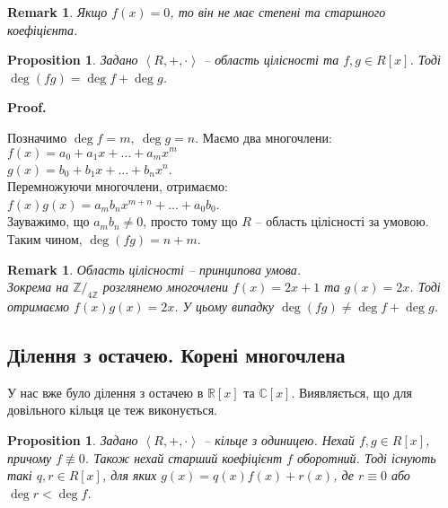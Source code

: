 \documentclass[a4paper, 10pt]{article}
\makeatletter
\theoremstyle{theoremdd}
\theoremstyle{theoremdd}
\theoremstyle{theoremdd}
\theoremstyle{theoremdd}
\theoremstyle{theoremdd}
\theoremstyle{theoremdd}
\theoremstyle{theoremdd}
\theoremstyle{theoremdd}
\theoremstyle{theoremdd}
\newtheorem{proposition}[theorem]{Proposition}
\theoremstyle{theoremdd}
\theoremstyle{theoremdd}
\newtheorem{remark}[theorem]{Remark}
\theoremstyle{theoremdd}
\theoremstyle{theoremdd}
\theoremstyle{theoremdd}
\theoremstyle{theoremdd}
\renewenvironment{proof}[1][Proof.\\]{\par
\pushQED{\hfill \qed}%
\normalfont \topsep6\p@\@plus6\p@\relax
\trivlist
\item\relax
{\bfseries
#1\@addpunct{.}}\hspace\labelsep\ignorespaces
}{%
\popQED\endtrivlist\@endpefalse
}
\makeatother
\begin{document}
\begin{remark}
Якщо $f(x) = 0$, то він не має степені та старшного коефіцієнта.
\end{remark}

\begin{proposition}
Задано $\left<R,+,\cdot\right>$ -- область цілісності та $f,g \in R[x]$. Тоді $\deg (fg) = \deg f + \deg g$.
\end{proposition}

\begin{proof}
Позначимо $\deg f = m,\ \deg g = n$. Маємо два многочлени:\\
$f(x) = a_0 + a_1 x + \dots + a_m x^m$\\
$g(x) = b_0 + b_1 x + \dots + b_n x^n$.\\
Перемножуючи многочлени, отримаємо:\\
$f(x)g(x) = a_m b_n x^{m+n} + \dots + a_0 b_0$.\\
Зауважимо, що $a_m b_n \neq 0$, просто тому що $R$ -- область цілісності за умовою. Таким чином, $\deg(fg) = n + m$.
\end{proof}

\begin{remark}
Область цілісності -- принципова умова.\\
Зокрема на $\mathbb{Z}/_{4 \mathbb{Z}}$ розглянемо многочлени $f(x) = 2x + 1$ та $g(x) = 2x$. Тоді отримаємо $f(x)g(x) = 2x$. У цьому випадку $\deg (fg) \neq \deg f + \deg g$.
\end{remark}

\subsection{Ділення з остачею. Корені многочлена}
У нас вже було ділення з остачею в $\mathbb{R}[x]$ та $\mathbb{C}[x]$. Виявляється, що для довільного кільця це теж виконується.

\begin{proposition}
Задано $\left< R,+,\cdot \right>$ -- кільце з одиницею. Нехай $f,g \in R[x]$, причому $f \not\equiv 0$. Також нехай старший коефіцієнт $f$ оборотний. Тоді існують такі $q,r \in R[x]$, для яких $g(x) = q(x)f(x) + r(x)$, де $r \equiv 0$ або $\deg r < \deg f$. 
\end{proposition}
\end{document}

